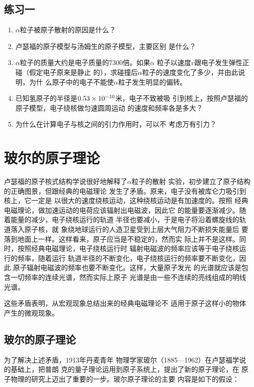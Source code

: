 \subsection*{练习一}
\begin{enumerate}
    \item $\alpha$粒子被原子散射的原因是什么？
    \item 卢瑟福的原子模型与汤姆生的原子模型，主要区别
    是什么？
    \item $\alpha$粒子的质量大约是电子质量的7300倍。如果$\alpha$
    粒子以速度$v$跟电子发生弹性正碰（假定电子原来是静止
    的），求碰撞后$\alpha$粒子的速度变化了多少，并由此说明，为什
    么原子中的电子不能使$\alpha$粒子发生明显的偏转。
    \item 已知氢原子的半径是$0.53\times10^{-10}$米，电子不致被吸
    引到核上，按照卢瑟福的原子模型，电子绕核做匀速圆周运动
    的速度和频率各是多大？
    \item 为什么在计算电子与核之间的引力作用时，可以不
    考虑万有引力？

\end{enumerate}

\section{玻尔的原子理论}
卢瑟福的原子核式结构学说很好地解释了$\alpha$粒子的散射
实验，初步建立了原子结构的正确图景，但跟经典的电磁理论
发生了矛盾。原来，电子没有被库仑力吸引到核上，它一定是
以很大的速度绕核运动，这种绕核运动是有加速度的。按照
经典电磁理论，做加速运动的电荷应该辐射出电磁波，因此它
的能量要逐渐减少。随着能量的减少，电子绕核运行的轨道
半径也要减小，于是电子将沿着螺旋线的轨道落入原子核，就
象绕地球运行的人造卫星受到上层大气阻力不断损失能量后
要落到地面上一样。这样看来，原子应当是不稳定的，然而实
际上并不是这样。同时，按照经典电磁理论，电子绕核运行时
辐射电磁波的频率应该等于电子绕核运行的频率，随着运行
轨道半径的不断变化，电子绕核运行的频率要不断变化，因此
原子辐射电磁波的频率也要不断变化。这样，大量原子发光
的光谱就应该是包含一切频率的连续光谱，然而实际上原子
光谱是由一些不连续的亮线组成的明线光谱。

这些矛盾表明，从宏观现象总结出来的经典电磁理论不
适用于原子这样小的物体产生的微观现象。

\subsection{玻尔的原子理论} 

为了解决上述矛盾，1913年丹麦青年
物理学家玻尔（1885—1962）在卢瑟福学说的基础上，把普朗
克的量子理论运用到原子系统上，提出了新的原子理论，在
原子物理的研究上迈出了重要的一步。玻尔原子理论的主要
内容是如下的假设：

